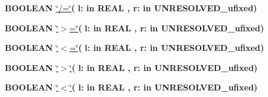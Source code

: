 \begin{DoxyCompactItemize}
\item 
{\bfseries {\bfseries \textcolor{comment}{B\+O\+O\+L\+E\+A\+N}\textcolor{vhdlchar}{ }}} \hyperlink{class__fixed__pkg_a00087aded97b434060226b9ba63a9077}{\char`\"{}/=\char`\"{}}{\bfseries  ( }{\bfseries \textcolor{vhdlchar}{l\+: }\textcolor{stringliteral}{in }{\bfseries \textcolor{comment}{R\+E\+A\+L}\textcolor{vhdlchar}{ }}}{\bfseries  , \textcolor{vhdlchar}{r\+: }\textcolor{stringliteral}{in }\textcolor{vhdlchar}{U\+N\+R\+E\+S\+O\+L\+V\+E\+D\+\_\+ufixed}}{\bfseries  )} 
\item 
{\bfseries {\bfseries \textcolor{comment}{B\+O\+O\+L\+E\+A\+N}\textcolor{vhdlchar}{ }}} \hyperlink{class__fixed__pkg_a4cd07e388cdbb3996dd11f56781d3758}{\char`\"{}$>$=\char`\"{}}{\bfseries  ( }{\bfseries \textcolor{vhdlchar}{l\+: }\textcolor{stringliteral}{in }{\bfseries \textcolor{comment}{R\+E\+A\+L}\textcolor{vhdlchar}{ }}}{\bfseries  , \textcolor{vhdlchar}{r\+: }\textcolor{stringliteral}{in }\textcolor{vhdlchar}{U\+N\+R\+E\+S\+O\+L\+V\+E\+D\+\_\+ufixed}}{\bfseries  )} 
\item 
{\bfseries {\bfseries \textcolor{comment}{B\+O\+O\+L\+E\+A\+N}\textcolor{vhdlchar}{ }}} \hyperlink{class__fixed__pkg_a65b73a94d4fe541a941f431175b342b7}{\char`\"{}$<$=\char`\"{}}{\bfseries  ( }{\bfseries \textcolor{vhdlchar}{l\+: }\textcolor{stringliteral}{in }{\bfseries \textcolor{comment}{R\+E\+A\+L}\textcolor{vhdlchar}{ }}}{\bfseries  , \textcolor{vhdlchar}{r\+: }\textcolor{stringliteral}{in }\textcolor{vhdlchar}{U\+N\+R\+E\+S\+O\+L\+V\+E\+D\+\_\+ufixed}}{\bfseries  )} 
\item 
{\bfseries {\bfseries \textcolor{comment}{B\+O\+O\+L\+E\+A\+N}\textcolor{vhdlchar}{ }}} \hyperlink{class__fixed__pkg_ac6c82329bf849852be997a3d0a737cf9}{\char`\"{}$>$\char`\"{}}{\bfseries  ( }{\bfseries \textcolor{vhdlchar}{l\+: }\textcolor{stringliteral}{in }{\bfseries \textcolor{comment}{R\+E\+A\+L}\textcolor{vhdlchar}{ }}}{\bfseries  , \textcolor{vhdlchar}{r\+: }\textcolor{stringliteral}{in }\textcolor{vhdlchar}{U\+N\+R\+E\+S\+O\+L\+V\+E\+D\+\_\+ufixed}}{\bfseries  )} 
\item 
{\bfseries {\bfseries \textcolor{comment}{B\+O\+O\+L\+E\+A\+N}\textcolor{vhdlchar}{ }}} \hyperlink{class__fixed__pkg_a5d059cf3277e3585e4f3f076db10b273}{\char`\"{}$<$\char`\"{}}{\bfseries  ( }{\bfseries \textcolor{vhdlchar}{l\+: }\textcolor{stringliteral}{in }{\bfseries \textcolor{comment}{R\+E\+A\+L}\textcolor{vhdlchar}{ }}}{\bfseries  , \textcolor{vhdlchar}{r\+: }\textcolor{stringliteral}{in }\textcolor{vhdlchar}{U\+N\+R\+E\+S\+O\+L\+V\+E\+D\+\_\+ufixed}}{\bfseries  )} 

\end{DoxyCompactItemize}
